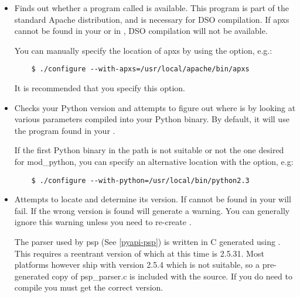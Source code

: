 \begin{itemize}

\item
  Finds out whether a program called  is available. This
  program is part of the standard Apache distribution, and is necessary
  for DSO compilation. If apxs cannot be found in your  or in
  , DSO compilation will not be available.

  You can manually specify the location of apxs by using the
   option, e.g.:

  \begin{verbatim}
    $ ./configure --with-apxs=/usr/local/apache/bin/apxs        
  \end{verbatim}

  It is recommended that you specify this option.

\item
  Checks your Python version and attempts to figure out where
   is by looking at various parameters compiled into
  your Python binary. By default, it will use the 
  program found in your .

  If the first Python binary in the path is not suitable or not the one
  desired for mod_python, you can specify an alternative location with the
   option, e.g:

  \begin{verbatim}
    $ ./configure --with-python=/usr/local/bin/python2.3
  \end{verbatim}                      

\item
  Attempts to locate  and determine its version. 
  If  cannot be found in your  
  will fail.  If the wrong version is found  will generate a warning.
  You can generally ignore this warning unless you need to re-create
  .
 
  The parser used by psp (See \ref{pyapi-psp}) is written in C generated using 
  . This requires a reentrant version of  which
  at this time is 2.5.31. Most platforms however ship with version 2.5.4
  which is not suitable, so a pre-generated copy of psp_parser.c is included
  with the source. If you do need to compile  you 
  must get the correct  version.
 

\end{itemize}
